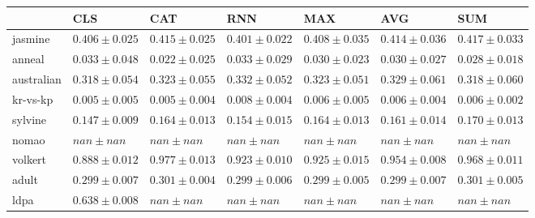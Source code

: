 \begin{tabular}{lllllll}
\toprule
 & CLS & CAT & RNN & MAX & AVG & SUM \\
\midrule
jasmine & $0.406 \pm 0.025$ & $0.415 \pm 0.025$ & $0.401 \pm 0.022$ & $0.408 \pm 0.035$ & $0.414 \pm 0.036$ & $0.417 \pm 0.033$ \\
anneal & $0.033 \pm 0.048$ & $0.022 \pm 0.025$ & $0.033 \pm 0.029$ & $0.030 \pm 0.023$ & $0.030 \pm 0.027$ & $0.028 \pm 0.018$ \\
australian & $0.318 \pm 0.054$ & $0.323 \pm 0.055$ & $0.332 \pm 0.052$ & $0.323 \pm 0.051$ & $0.329 \pm 0.061$ & $0.318 \pm 0.060$ \\
kr-vs-kp & $0.005 \pm 0.005$ & $0.005 \pm 0.004$ & $0.008 \pm 0.004$ & $0.006 \pm 0.005$ & $0.006 \pm 0.004$ & $0.006 \pm 0.002$ \\
sylvine & $0.147 \pm 0.009$ & $0.164 \pm 0.013$ & $0.154 \pm 0.015$ & $0.164 \pm 0.013$ & $0.161 \pm 0.014$ & $0.170 \pm 0.013$ \\
nomao & $nan \pm nan$ & $nan \pm nan$ & $nan \pm nan$ & $nan \pm nan$ & $nan \pm nan$ & $nan \pm nan$ \\
volkert & $0.888 \pm 0.012$ & $0.977 \pm 0.013$ & $0.923 \pm 0.010$ & $0.925 \pm 0.015$ & $0.954 \pm 0.008$ & $0.968 \pm 0.011$ \\
adult & $0.299 \pm 0.007$ & $0.301 \pm 0.004$ & $0.299 \pm 0.006$ & $0.299 \pm 0.005$ & $0.299 \pm 0.007$ & $0.301 \pm 0.005$ \\
ldpa & $0.638 \pm 0.008$ & $nan \pm nan$ & $nan \pm nan$ & $nan \pm nan$ & $nan \pm nan$ & $nan \pm nan$ \\
\bottomrule
\end{tabular}
